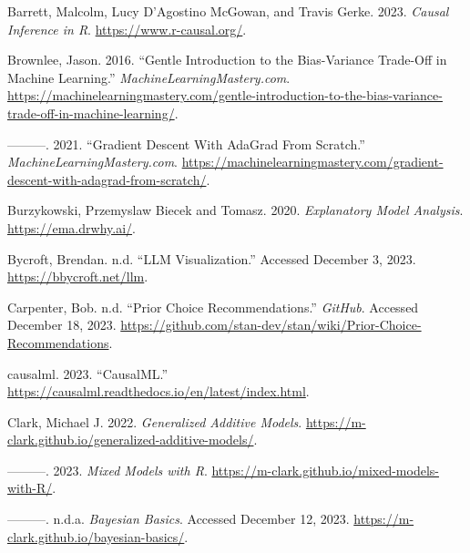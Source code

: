 \documentclass[
  letterpaper,
]{krantz}
\newlength{\cslhangindent}
\newlength{\cslentryspacingunit} %
\newenvironment{CSLReferences}[2] %
 {%
  \setlength{\parindent}{0pt}
  \ifodd #1
  \let\oldpar\par
  \def\par{\hangindent=\cslhangindent\oldpar}
  \fi
  \setlength{\parskip}{#2\cslentryspacingunit}
 }%
 {}
\begin{document}
\hypertarget{refs}{}
\begin{CSLReferences}{1}{0}
\leavevmode{}%
Barrett, Malcolm, Lucy D'Agostino McGowan, and Travis Gerke. 2023.
\emph{Causal {Inference} in {R}}. \url{https://www.r-causal.org/}.

\leavevmode{}%
Brownlee, Jason. 2016. {``Gentle {Introduction} to the {Bias}-{Variance}
{Trade}-{Off} in {Machine} {Learning}.''}
\emph{MachineLearningMastery.com}.
\url{https://machinelearningmastery.com/gentle-introduction-to-the-bias-variance-trade-off-in-machine-learning/}.

\leavevmode{}%
---------. 2021. {``Gradient {Descent} {With} {AdaGrad} {From}
{Scratch}.''} \emph{MachineLearningMastery.com}.
\url{https://machinelearningmastery.com/gradient-descent-with-adagrad-from-scratch/}.

\leavevmode{}%
Burzykowski, Przemyslaw Biecek and Tomasz. 2020. \emph{Explanatory
{Model} {Analysis}}. \url{https://ema.drwhy.ai/}.

\leavevmode{}%
Bycroft, Brendan. n.d. {``{LLM} {Visualization}.''} Accessed December 3,
2023. \url{https://bbycroft.net/llm}.

\leavevmode{}%
Carpenter, Bob. n.d. {``Prior {Choice} {Recommendations}.''}
\emph{GitHub}. Accessed December 18, 2023.
\url{https://github.com/stan-dev/stan/wiki/Prior-Choice-Recommendations}.

\leavevmode{}%
causalml. 2023. {``{CausalML}.''}
\url{https://causalml.readthedocs.io/en/latest/index.html}.

\leavevmode{}%
Clark, Michael J. 2022. \emph{Generalized {Additive} {Models}}.
\url{https://m-clark.github.io/generalized-additive-models/}.

\leavevmode{}%
---------. 2023. \emph{Mixed {Models} with {R}}.
\url{https://m-clark.github.io/mixed-models-with-R/}.

\leavevmode{}%
---------. n.d.a. \emph{Bayesian {Basics}}. Accessed December 12, 2023.
\url{https://m-clark.github.io/bayesian-basics/}.


\end{CSLReferences}
\end{document}
